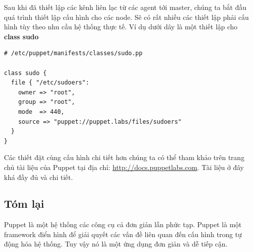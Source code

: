 Sau khi đã thiết lập các kênh liên lạc từ các agent tới master, chúng ta bắt đầu quá trình thiết lập cấu hình cho các node. Sẽ có rất nhiều các thiết lập phải cấu hình tùy theo nhu cầu hệ thống thực tế. Ví dụ dưới dây là một thiết lập cho \textbf{class sudo}

\begin{lstlisting}[label={lst:puppet_config_class_sudo},caption={Cấu hình class sudo của Puppet},morekeywords={class, file, source, owner, group, mode, source}]
# /etc/puppet/manifests/classes/sudo.pp

class sudo {
  file { "/etc/sudoers":
    owner => "root",
    group => "root",
    mode  => 440,
    source => "puppet://puppet.labs/files/sudoers"
  }
}
\end{lstlisting}

Các thiết đặt cùng cấu hình chi tiết hơn chúng ta có thể tham khảo trên trang chủ tài liệu của Puppet tại địa chỉ: \url{http://docs.puppetlabs.com}. Tài liệu ở đây khá đầy đủ và chi tiết.

\subsection*{Tóm lại}

Puppet là một hệ thống các công cụ cả đơn giản lẫn phức tạp. Puppet là một framework điển hình để giải quyết các vấn đề liên quan đến cấu hình trong tự động hóa hệ thống. Tuy vậy nó là một ứng dụng đơn giản và dễ tiếp cận.
